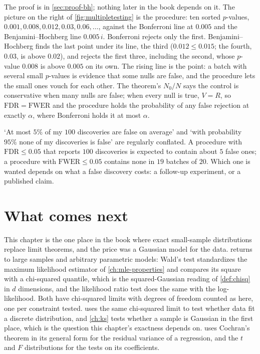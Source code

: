 The proof is in \cref{sec:proof-bh}; nothing later in the book depends on it.
The picture on the right of \cref{fig:multipletesting} is the procedure: ten sorted $p$-values, $0.001, 0.008, 0.012, 0.03, 0.06, \ldots$, against the Bonferroni line at $0.005$ and the Benjamini--Hochberg line $0.005\,i$.
Bonferroni rejects only the first.
Benjamini--Hochberg finds the last point under its line, the third ($0.012 \leq 0.015$; the fourth, $0.03$, is above $0.02$), and rejects the first three, including the second, whose $p$-value $0.008$ is above $0.005$ on its own.
The rising line is the point: a batch with several small $p$-values is evidence that some nulls are false, and the procedure lets the small ones vouch for each other.
The theorem's $N_0/N$ says the control is conservative when many nulls are false; when every null is true, $V = R$, so $\mathrm{FDR} = \mathrm{FWER}$ and the procedure holds the probability of any false rejection at exactly $\alpha$, where Bonferroni holds it at most $\alpha$.

\begin{pitfall}
`At most $5\%$ of my $100$ discoveries are false on average' and `with probability $95\%$ none of my discoveries is false' are regularly conflated.
A procedure with $\mathrm{FDR} \leq 0.05$ that reports $100$ discoveries is expected to contain about $5$ false ones; a procedure with $\mathrm{FWER} \leq 0.05$ contains none in $19$ batches of $20$.
Which one is wanted depends on what a false discovery costs: a follow-up experiment, or a published claim.
\end{pitfall}

\section{What comes next}
\label{sec:t-next}

This chapter is the one place in the book where exact small-sample distributions replace limit theorems, and the price was a Gaussian model for the data.
 returns to large samples and arbitrary parametric models: Wald's test standardizes the maximum likelihood estimator of \cref{ch:mle-properties} and compares its square with a chi-squared quantile, which is the squared-Gaussian reading of \cref{def:chisq} in $d$ dimensions, and the likelihood ratio test does the same with the log-likelihood.
Both have chi-squared limits with degrees of freedom counted as here, one per constraint tested.
 uses the same chi-squared limit to test whether data fit a discrete distribution, and \cref{ch:ks} tests whether a sample is Gaussian in the first place, which is the question this chapter's exactness depends on.
 uses Cochran's theorem in its general form for the residual variance of a regression, and the $t$ and $F$ distributions for the tests on its coefficients.

